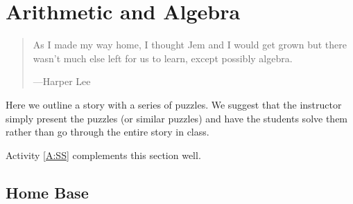\chapter{Arithmetic and Algebra}

\begin{quote}
As I made my way home, I thought Jem and I would get grown but there
wasn't much else left for us to learn, except possibly algebra.

\hfill---Harper Lee
\end{quote}


\begin{teachingnote}
Here we outline a story with a series of puzzles. We suggest that the
instructor simply present the puzzles (or similar puzzles) and have
the students solve them rather than go through the entire story in class.
\end{teachingnote}


\begin{activitynote}
Activity \ref{A:SS} complements this section well.  %
\end{activitynote}


\section{Home Base}

